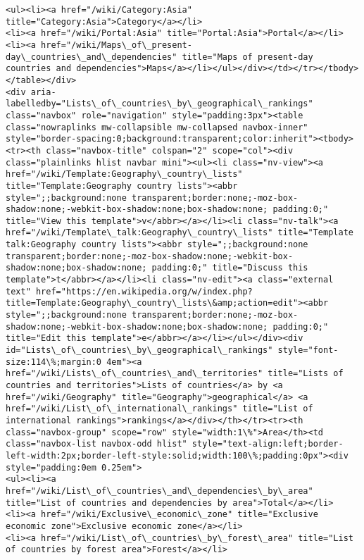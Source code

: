 \documentclass[11pt]{article}
\begin{document}
\begin{Verbatim}[commandchars=\\\{\}]
<ul><li><a href="/wiki/Category:Asia" title="Category:Asia">Category</a></li>
<li><a href="/wiki/Portal:Asia" title="Portal:Asia">Portal</a></li>
<li><a href="/wiki/Maps\_of\_present-day\_countries\_and\_dependencies" title="Maps of present-day countries and dependencies">Maps</a></li></ul></div></td></tr></tbody></table></div>
<div aria-labelledby="Lists\_of\_countries\_by\_geographical\_rankings" class="navbox" role="navigation" style="padding:3px"><table class="nowraplinks mw-collapsible mw-collapsed navbox-inner" style="border-spacing:0;background:transparent;color:inherit"><tbody><tr><th class="navbox-title" colspan="2" scope="col"><div class="plainlinks hlist navbar mini"><ul><li class="nv-view"><a href="/wiki/Template:Geography\_country\_lists" title="Template:Geography country lists"><abbr style=";;background:none transparent;border:none;-moz-box-shadow:none;-webkit-box-shadow:none;box-shadow:none; padding:0;" title="View this template">v</abbr></a></li><li class="nv-talk"><a href="/wiki/Template\_talk:Geography\_country\_lists" title="Template talk:Geography country lists"><abbr style=";;background:none transparent;border:none;-moz-box-shadow:none;-webkit-box-shadow:none;box-shadow:none; padding:0;" title="Discuss this template">t</abbr></a></li><li class="nv-edit"><a class="external text" href="https://en.wikipedia.org/w/index.php?title=Template:Geography\_country\_lists\&amp;action=edit"><abbr style=";;background:none transparent;border:none;-moz-box-shadow:none;-webkit-box-shadow:none;box-shadow:none; padding:0;" title="Edit this template">e</abbr></a></li></ul></div><div id="Lists\_of\_countries\_by\_geographical\_rankings" style="font-size:114\%;margin:0 4em"><a href="/wiki/Lists\_of\_countries\_and\_territories" title="Lists of countries and territories">Lists of countries</a> by <a href="/wiki/Geography" title="Geography">geographical</a> <a href="/wiki/List\_of\_international\_rankings" title="List of international rankings">rankings</a></div></th></tr><tr><th class="navbox-group" scope="row" style="width:1\%">Area</th><td class="navbox-list navbox-odd hlist" style="text-align:left;border-left-width:2px;border-left-style:solid;width:100\%;padding:0px"><div style="padding:0em 0.25em">
<ul><li><a href="/wiki/List\_of\_countries\_and\_dependencies\_by\_area" title="List of countries and dependencies by area">Total</a></li>
<li><a href="/wiki/Exclusive\_economic\_zone" title="Exclusive economic zone">Exclusive economic zone</a></li>
<li><a href="/wiki/List\_of\_countries\_by\_forest\_area" title="List of countries by forest area">Forest</a></li>

\end{Verbatim}
\end{document}

